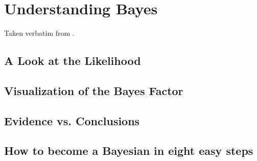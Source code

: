 
\chapter{Understanding Bayes}
\label{chap:UnderstandingBayes}


Taken verbatim from \cite{etz2015a,etz2015b,etz2015c,etz2016a}.

\section{A Look at the Likelihood}
\label{sec:ALookattheLikelihood}



\section{Visualization of the Bayes Factor}
\label{sec:VisualizationoftheBayesFactor}



\section{Evidence vs. Conclusions}
\label{sec:Evidencevs.Conclusions}



\section{How to become a Bayesian in eight easy steps}
\label{sec:HowtobecomeaBayesianineighteasysteps}




